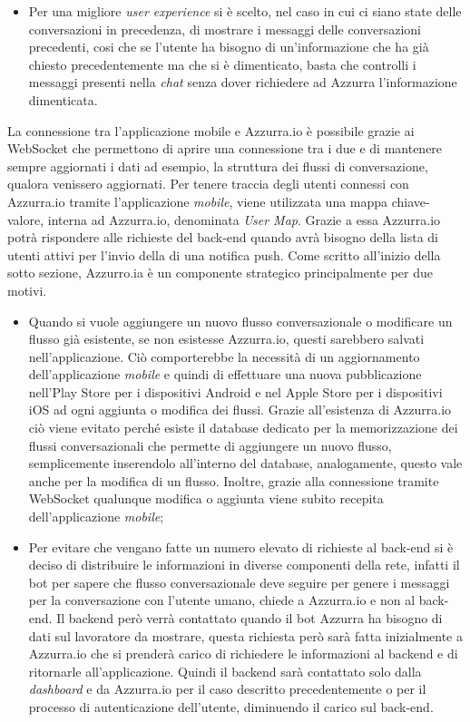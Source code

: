 \begin{trivlist}
\begin{itemize}
		\item Per una migliore \emph{user experience} si è scelto, nel caso in cui ci siano state delle conversazioni in precedenza, di mostrare i messaggi delle conversazioni precedenti, cosi che se l'utente ha bisogno di un’informazione che ha già chiesto precedentemente ma che si è dimenticato, basta che controlli i messaggi presenti nella \emph{chat} senza dover richiedere ad Azzurra l'informazione dimenticata.
	\end{itemize}
	La connessione tra l'applicazione mobile e Azzurra.io è possibile grazie ai \gls{WebSocket}\ap{[g]} che permettono di aprire una connessione tra i due e di mantenere sempre aggiornati i dati ad esempio, la struttura dei flussi di conversazione, qualora venissero aggiornati. Per tenere traccia degli utenti connessi con Azzurra.io tramite l'applicazione \emph{mobile}, viene utilizzata una mappa chiave-valore, interna ad Azzurra.io, denominata \emph{User Map}. Grazie a essa Azzurra.io potrà rispondere alle richieste del back-end quando avrà bisogno della lista di utenti attivi per l'invio della di una \gls{notifica push}\ap{[g]}. Come scritto all'inizio della sotto sezione, Azzurro.ia è un componente strategico principalmente per due motivi.
	\begin{itemize}
		\item Quando si vuole aggiungere un nuovo flusso conversazionale o modificare un flusso già esistente, se non esistesse Azzurra.io, questi sarebbero salvati nell'applicazione. Ciò comporterebbe la necessità di un aggiornamento dell'applicazione \emph{mobile} e quindi di effettuare una nuova pubblicazione nell'Play Store per i dispositivi \gls{Android}\ap{[g]} e nel Apple Store per i dispositivi \gls{iOS}\ap{[g]} ad ogni aggiunta o modifica dei flussi. Grazie all'esistenza di Azzurra.io ciò viene evitato perché esiste il database dedicato per la memorizzazione dei flussi conversazionali che permette di aggiungere un nuovo flusso, semplicemente inserendolo all'interno del database, analogamente, questo vale anche per la modifica di un flusso. Inoltre, grazie alla connessione tramite \gls{WebSocket}\ap{[g]} qualunque modifica o aggiunta viene subito recepita dell'applicazione \emph{mobile};
		\item Per evitare che vengano fatte un numero elevato di richieste al back-end si è deciso di distribuire le informazioni in diverse componenti della rete, infatti il \gls{bot}\ap{[g]} per sapere che flusso conversazionale deve seguire per genere i messaggi per la conversazione con l'utente umano, chiede a Azzurra.io e non al back-end. Il backend però verrà contattato quando il \gls{bot}\ap{[g]} Azzurra ha bisogno di dati sul lavoratore da mostrare, questa richiesta però sarà fatta inizialmente a Azzurra.io che si prenderà carico di richiedere le informazioni al backend e di ritornarle all'applicazione. Quindi il backend sarà contattato solo dalla \emph{dashboard} e da Azzurra.io per il caso descritto precedentemente o per il processo di autenticazione dell'utente, diminuendo il carico sul back-end.
	\end{itemize}
	

\end{trivlist}
